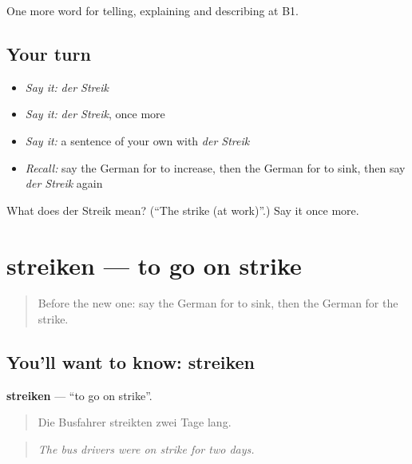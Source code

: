 \begin{grammarlens}[title={What you've built}]
One more word for telling, explaining and describing at B1.
\end{grammarlens}

\subsection*{Your turn}
\begin{itemize}
\raggedright
  \item \emph{Say it:} \emph{der Streik}
  \item \emph{Say it:} \emph{der Streik}, once more
  \item \emph{Say it:} a sentence of your own with \emph{der Streik}
  \item \emph{Recall:} say the German for to increase, then the German for to sink, then say \emph{der Streik} again
\end{itemize}

\begin{tcolorbox}[breakable,colback=teal!4,colframe=teal!35!black,title={Before you move on}]
What does der Streik mean? (\textquotedblleft{}The strike (at work)\textquotedblright{}.) Say it once more.
\end{tcolorbox}
\section[streiken]{streiken — to go on strike}

\label{lesson:GE-C277-streiken}



\begin{quote}
Before the new one: say the German for to sink, then the German for the strike.
\end{quote}

\subsection*{You'll want to know: streiken}
\textbf{streiken} — \textquotedblleft{}to go on strike\textquotedblright{}.

\begin{quote}
Die Busfahrer streikten zwei Tage lang.
\end{quote}

\begin{quote}
\emph{The bus drivers were on strike for two days.}
\end{quote}

